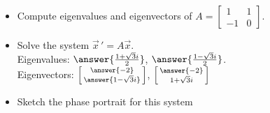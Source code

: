 \documentclass{ximera}
\begin{document}
\begin{exercise}%
    \begin{itemize}
        \item Compute eigenvalues and eigenvectors of
            $A=\left[ 
                \begin{smallmatrix}
                    1 & 1 \\
                    -1 & 0 
                \end{smallmatrix}
            \right]$.
        \item Solve the system $\vec{x}\,' = A\vec{x}$.\\
            Eigenvalues: $\answer{\frac{1+\sqrt{3}i}{2}}$, $\answer{\frac{1-\sqrt{3}i}{2}}$.\\
            Eigenvectors:
            $\left[ \begin{smallmatrix}
            \answer{-2} \\ \answer{1-\sqrt{3}i}
            \end{smallmatrix}\right]$, 
            $\left[ \begin{smallmatrix}
            \answer{-2} \\ 1+\sqrt{3}i
            \end{smallmatrix}\right]$
            \item Sketch the phase portrait for this system
    \end{itemize}
\end{exercise}
\end{document}

